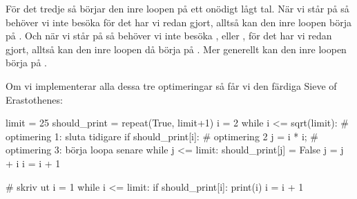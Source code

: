 För det tredje så börjar den inre loopen på ett onödigt lågt tal. När vi står på  så behöver vi inte besöka  för det har vi redan gjort, alltså kan den inre loopen börja på . Och när vi står på  så behöver vi inte besöka ,  eller , för det har vi redan gjort, alltså kan den inre loopen då börja på . Mer generellt kan den inre loopen börja på .

Om vi implementerar alla dessa tre optimeringar så får vi den färdiga Sieve of Erastothenes:
\vspace{10pt}

\begin{python}
limit = 25
should_print = repeat(True, limit+1)
i = 2
while i <= sqrt(limit): # optimering 1: sluta tidigare
	if should_print[i]: # optimering 2
		j = i * i; # optimering 3: börja loopa senare
		while j <= limit:
			should_print[j] = False
			j = j + i
	i = i + 1

# skriv ut
i = 1
while i <= limit:
	if should_print[i]:
		print(i)
	i = i + 1
\end{python}
